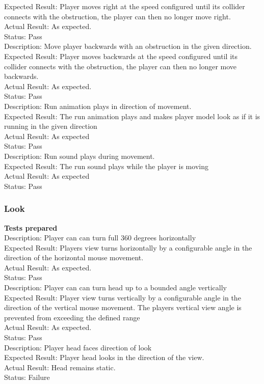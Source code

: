 \documentclass[11pt,a4paper]{article}
\begin{document}
Expected Result: Player moves right at the speed configured until its collider connects with the obstruction, the player can then no longer move right.\\
Actual Result: As expected.\\
Status: Pass
\smallskip\\
Description: Move player backwards with an obstruction in the given direction.\\
Expected Result: Player moves backwards at the speed configured until its collider connects with the obstruction, the player can then no longer move backwards.\\
Actual Result: As expected.\\
Status: Pass
\smallskip\\
Description: Run animation plays in direction of movement.\\
Expected Result: The run animation plays and makes player model look as if it is running in the given direction\\
Actual Result: As expected\\
Status: Pass
\smallskip\\
Description: Run sound plays during movement.\\
Expected Result: The run sound plays while the player is moving\\
Actual Result: As expected\\
Status: Pass
\subsubsection{Look}
\textbf{Tests prepared}\\
Description: Player can can turn full 360 degrees horizontally\\
Expected Result: Players view turns horizontally by a configurable angle in the direction of the horizontal mouse movement.\\
Actual Result: As expected.\\
Status: Pass
\smallskip\\
Description: Player can can turn head up to a bounded angle vertically\\
Expected Result: Player view turns vertically by a configurable angle in the direction of the vertical mouse movement. The players vertical view angle is prevented from exceeding the defined range\\
Actual Result: As expected.\\
Status: Pass
\smallskip\\
Description: Player head faces direction of look\\
Expected Result: Player head looks in the direction of the view.\\
Actual Result:  Head remains static.\\
Status: Failure
\end{document}
